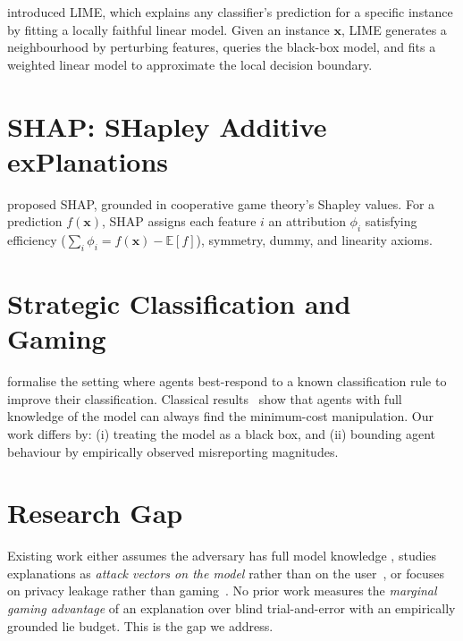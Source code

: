 \documentclass[12pt, a4paper, oneside]{report}
\theoremstyle{definition}
\begin{document}
\citet{ribeiro2016lime} introduced LIME, which explains any classifier's
prediction for a specific instance by fitting a locally faithful linear
model. Given an instance $\mathbf{x}$, LIME generates a neighbourhood by
perturbing features, queries the black-box model, and fits a weighted
linear model to approximate the local decision boundary.


\section{SHAP: SHapley Additive exPlanations}

\citet{lundberg2017shap} proposed SHAP, grounded in cooperative game theory's
Shapley values. For a prediction $f(\mathbf{x})$, SHAP assigns each feature $i$
an attribution $\phi_i$ satisfying efficiency ($\sum_i \phi_i = f(\mathbf{x}) - \mathbb{E}[f]$),
symmetry, dummy, and linearity axioms.


\section{Strategic Classification and Gaming}

\citet{ghalme2021strategic} formalise the setting where agents best-respond
to a known classification rule to improve their classification. Classical
results~\citep{hardt2016strategic} show that agents with full knowledge of
the model can always find the minimum-cost manipulation. Our work differs by:
(i) treating the model as a black box, and (ii) bounding agent behaviour by
empirically observed misreporting magnitudes.


\section{Research Gap}

Existing work either assumes the adversary has full model knowledge
\citep{ghalme2021strategic}, studies explanations as \textit{attack vectors
on the model} rather than on the user~\citep{slack2020fooling}, or focuses
on privacy leakage rather than gaming~\citep{shokri2021privacy}. No prior
work measures the \textit{marginal gaming advantage} of an explanation over
blind trial-and-error with an empirically grounded lie budget. This is
the gap we address.
\end{document}
